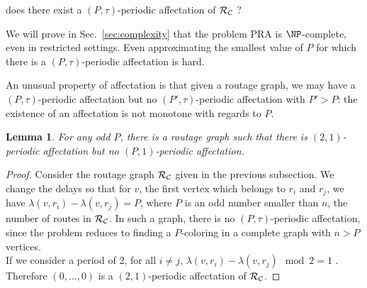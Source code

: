 \documentclass[a4paper,10pt]{article}
\newtheorem{lemma}[theorem]{Lemma}
\begin{document}
       does there exist a $(P,\tau)$-periodic affectation of $\cal R_{\cal C}$ ?


      We will prove in Sec.~\ref{sec:complexity} that the problem PRA is $\NP$-complete, even in restricted settings.
      Even approximating the smallest value of $P$ for which there is a $(P,\tau)$-periodic affectation is hard.

      An unusual property of affectation is that given a routage graph, we may have a $(P,\tau)$-periodic affectation but no
      $(P',\tau)$-periodic affectation with $P' > P$: the existence of an affectation is not monotone with regards to $P$.

	\begin{lemma} \label{lemma:monotonic}
	 For any odd $P$, there is a routage graph such that there is $(2,1)$-periodic affectation but no $(P,1)$-periodic affectation.
	\end{lemma}
\begin{proof}

      Consider the routage graph ${\cal R_{\cal C}}$ given in the previous subsection. 
      We change the delays so that for $v$, the first vertex which belongs to $r_i$ and $r_j$,
      we have $\lambda(v,r_i) - \lambda(v,r_j)= P$, where $P$ is an odd number smaller than $n$, the number of routes in ${\cal R_{\cal C}}$. In such a graph, there is no $(P,\tau)$-periodic affectation, since the problem reduces to finding a $P$-coloring in a complete graph with $n > P$ vertices.\\
      If we consider a period of $2$, for all $i \neq j$, $\lambda(v,r_i) - \lambda(v,r_j) \mod 2 = 1$ . Therefore $(0,\dots,0)$ is a $(2,1)$-periodic affectation of ${\cal R_{\cal C}}$.

      
\end{proof}
      
% 
\end{document}
